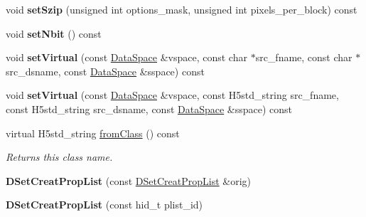 \begin{DoxyCompactItemize}
void {\bfseries set\+Szip} (unsigned int options\+\_\+mask, unsigned int pixels\+\_\+per\+\_\+block) const
\item 
\mbox{\label{class_h5_1_1_d_set_creat_prop_list_a0f1882fa81bac7edaae5d771d6c5029e}} 
void {\bfseries set\+Nbit} () const
\item 
\mbox{\label{class_h5_1_1_d_set_creat_prop_list_a595c7bcad3a21708013a825e465d8284}} 
void {\bfseries set\+Virtual} (const \hyperlink{class_h5_1_1_data_space}{Data\+Space} \&vspace, const char $\ast$src\+\_\+fname, const char $\ast$src\+\_\+dsname, const \hyperlink{class_h5_1_1_data_space}{Data\+Space} \&sspace) const
\item 
\mbox{\label{class_h5_1_1_d_set_creat_prop_list_ab887b57809885518c60c9eb4a98434a8}} 
void {\bfseries set\+Virtual} (const \hyperlink{class_h5_1_1_data_space}{Data\+Space} \&vspace, const H5std\+\_\+string src\+\_\+fname, const H5std\+\_\+string src\+\_\+dsname, const \hyperlink{class_h5_1_1_data_space}{Data\+Space} \&sspace) const
\item 
\mbox{\label{class_h5_1_1_d_set_creat_prop_list_aae0bda38c97a2ab85679caad38c4bb87}} 
virtual H5std\+\_\+string \hyperlink{class_h5_1_1_d_set_creat_prop_list_aae0bda38c97a2ab85679caad38c4bb87}{from\+Class} () const
\begin{DoxyCompactList}\small\item\em Returns this class name. \end{DoxyCompactList}\item 
\mbox{\label{class_h5_1_1_d_set_creat_prop_list_a56589016937912cf3ae2726e984c151f}} 
{\bfseries D\+Set\+Creat\+Prop\+List} (const \hyperlink{class_h5_1_1_d_set_creat_prop_list}{D\+Set\+Creat\+Prop\+List} \&orig)
\item 
\mbox{\label{class_h5_1_1_d_set_creat_prop_list_a424f8842860c7956ac4399664b224aba}} 
{\bfseries D\+Set\+Creat\+Prop\+List} (const hid\+\_\+t plist\+\_\+id)
\item 
\mbox{\label{class_h5_1_1_d_set_creat_prop_list_a1025d1da39a94d45f6517871617ebec9}} 

\end{DoxyCompactItemize}
